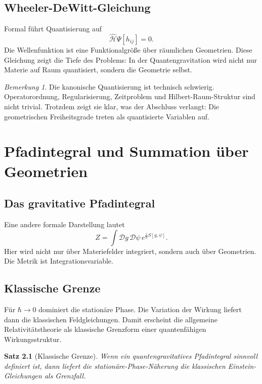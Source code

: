 \documentclass[11pt,a4paper]{book}
\newtheorem{satz}{Satz}[chapter]
\theoremstyle{remark}
\newtheorem{bemerkung}{Bemerkung}[chapter]
\begin{document}
\section{Wheeler-DeWitt-Gleichung}
Formal führt Quantisierung auf
\begin{equation}
\hat{\mathcal{H}}\Psi[h_{ij}]=0.
\end{equation}
Die Wellenfunktion ist eine Funktionalgröße über räumlichen Geometrien. Diese Gleichung zeigt die Tiefe des Problems: In der Quantengravitation wird nicht nur Materie auf Raum quantisiert, sondern die Geometrie selbst.

\begin{bemerkung}
Die kanonische Quantisierung ist technisch schwierig. Operatorordnung, Regularisierung, Zeitproblem und Hilbert-Raum-Struktur sind nicht trivial. Trotzdem zeigt sie klar, was der Abschluss verlangt: Die geometrischen Freiheitsgrade treten als quantisierte Variablen auf.
\end{bemerkung}

\chapter{Pfadintegral und Summation über Geometrien}
\section{Das gravitative Pfadintegral}
Eine andere formale Darstellung lautet
\begin{equation}
Z=\int \mathcal{D}g\,\mathcal{D}\psi\,e^{\frac{i}{\hbar}S[g,\psi]}.
\end{equation}
Hier wird nicht nur über Materiefelder integriert, sondern auch über Geometrien. Die Metrik ist Integrationsvariable.

\section{Klassische Grenze}
Für $\hbar\to 0$ dominiert die stationäre Phase. Die Variation der Wirkung liefert dann die klassischen Feldgleichungen. Damit erscheint die allgemeine Relativitätstheorie als klassische Grenzform einer quantenfähigen Wirkungsstruktur.

\begin{satz}[Klassische Grenze]
Wenn ein quantengravitatives Pfadintegral sinnvoll definiert ist, dann liefert die stationäre-Phase-Näherung die klassischen Einstein-Gleichungen als Grenzfall.
\end{satz}
\end{document}
